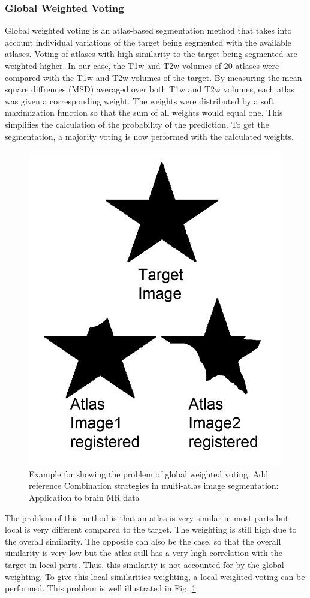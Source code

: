 \subsubsection*{Global Weighted Voting}
Global weighted voting is an atlas-based segmentation method that takes into account individual variations of the target being segmented with the available atlases. Voting of atlases with high similarity to the target being segmented are weighted higher. In our case, the T1w and T2w volumes of 20 atlases were compared with the T1w and T2w volumes of the target. By measuring the mean square diffrences (MSD) averaged over both T1w and T2w volumes, each atlas was given a corresponding weight.  The weights were distributed by a soft maximization function so that the sum of all weights would equal one. This simplifies the calculation of the probability of the prediction. To get the segmentation, a majority voting is now performed with the calculated weights.

\begin{figure}[h!]
	\centering
	\includegraphics[width=0.5\linewidth]{img/globalWeightedProblematic}
	\caption{Example for showing the problem of global weighted voting. \color{red} Add reference Combination strategies in multi-atlas image segmentation: Application to brain MR data}
	\label{fig:globalweightedproblematic}
\end{figure}

The problem of this method is that an atlas is very similar in most parts but local is very different compared to the target. The weighting is still high due to the overall similarity. The opposite can also be the case, so that the overall similarity is very low but the atlas still has a very high correlation with the target in local parts. Thus, this similarity is not accounted for by the global weighting. To give this local similarities weighting, a local weighted voting can be performed. This problem is well illustrated in Fig. \ref{fig:globalweightedproblematic}.

